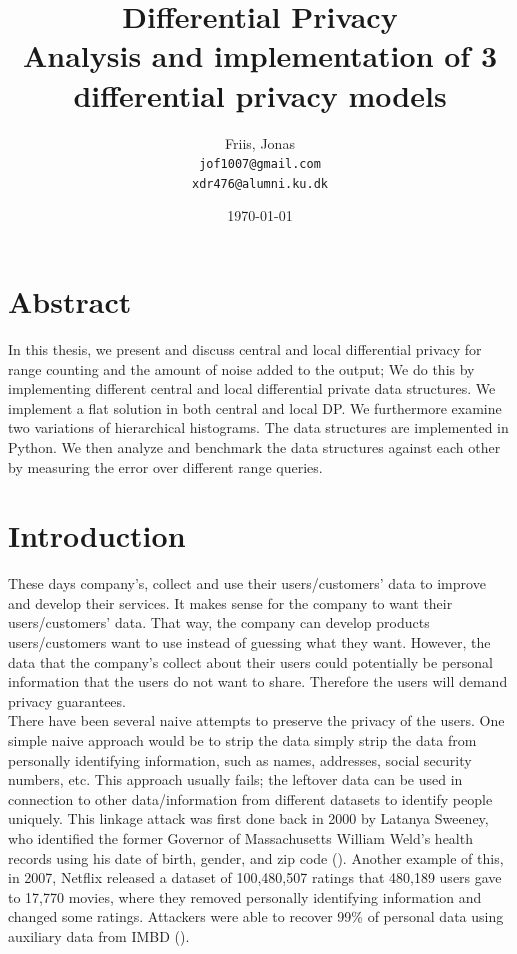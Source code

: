 \documentclass[11pt]{article}
\title{
  \vspace{3cm}
  \Huge{Differential Privacy} \\
  \Large{Analysis and implementation of 3 differential privacy models}
}
\author{
  \Large{Friis, Jonas}
  \\ \texttt{jof1007@gmail.com} \\
\texttt{xdr476@alumni.ku.dk}
}
\date{
    \today
}
\theoremstyle{definition}
\def \ColourPDF {include/ku-farve}
\def \TitlePDF   {include/nat-en}  %
\begin{document}


\clearpage\maketitle
\thispagestyle{empty}

\newpage

\section{Abstract}
In this thesis, we present and discuss central and local differential privacy for range counting and the amount of noise added to the output; We do this by implementing different central and local differential private data structures. We implement a flat solution in both central and local DP. We furthermore examine two variations of hierarchical histograms. The data structures are implemented in Python. We then analyze and benchmark the data structures against each other by measuring the error over different range queries. 


\newpage
\tableofcontents
\newpage
\section{Introduction}
These days company's, collect and use their users/customers' data to improve and develop their services. It makes sense for the company to want their users/customers' data. That way, the company can develop products users/customers want to use instead of guessing what they want. However, the data that the company's collect about their users could potentially be personal information that the users do not want to share. Therefore the users will demand privacy guarantees. \\

\noindent There have been several naive attempts to preserve the privacy of the users.  One simple naive approach would be to strip the data simply strip the data from personally identifying information, such as names, addresses, social security numbers, etc. This approach usually fails; the leftover data can be used in connection to other data/information from different datasets to identify people uniquely. This linkage attack was first done back in 2000 by Latanya Sweeney, who identified the former Governor of Massachusetts  William Weld's health records using his date of birth, gender, and zip code (\cite{Sweeney}). Another example of this, in 2007, Netflix released a dataset of 100,480,507 ratings that 480,189 users gave to 17,770 movies, where they removed personally identifying information and changed some ratings. Attackers were able to recover 99\% of personal data using auxiliary data from IMBD (\cite{netflix}). \\
\end{document}

